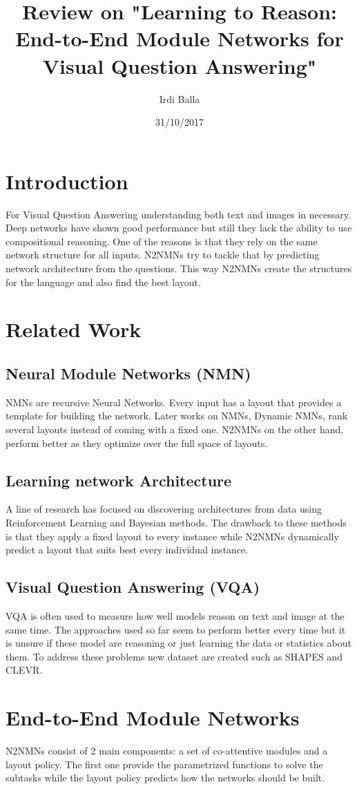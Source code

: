 \documentclass{article}
\title{Review on "Learning to Reason: End-to-End Module Networks for Visual Question Answering"}
\date{31/10/2017}
\author{Irdi Balla}
\begin{document}
	\maketitle	
	\section{Introduction}
	For Visual Question Answering understanding both text and images in necessary. Deep networks have shown good performance but still they lack the ability to use compositional reasoning. One of the reasons is that they rely on the same network structure for all inputs. N2NMNs try to tackle that by predicting network architecture from the questions. This way N2NMNs create the structures for the language and also find the best layout.
	\section{Related Work}
	\subsection{Neural Module Networks (NMN)}
	NMNs are recursive Neural Networks. Every input has a layout that provides a template for building the network. Later works on NMNs, Dynamic NMNs, rank several layouts instead of coming with a fixed one. N2NMNs on the other hand, perform better as they optimize over the full space of layouts.
	\subsection{Learning network Architecture}
	A line of research has focused on discovering architectures from data using Reinforcement Learning and Bayesian methods. The drawback to these methods is that they apply a fixed layout to every instance while N2NMNs dynamically predict a layout that suits best every individual instance.
	\subsection{Visual Question Answering (VQA)}
	VQA is often used to measure how well models reason on text and image at the same time. The approaches used so far seem to perform better every time but it is unsure if these model are reasoning or just learning the data or statistics about them. To address these problems new dataset are created such as SHAPES and CLEVR.
	\section{End-to-End Module Networks}
	N2NMNs consist of 2 main components: a set of co-attentive modules and a layout policy. The first one provide the parametrized functions to solve the subtasks while the layout policy predicts how the networks should be built.
\end{document}
